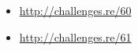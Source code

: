 \section{\Exercises}

\begin{itemize}
	\item \url{http://challenges.re/60}
	\item \url{http://challenges.re/61}
\end{itemize}

